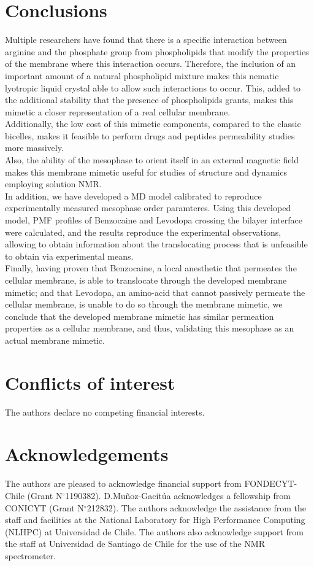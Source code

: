 \documentclass[3p,preprint,review]{elsarticle}
\begin{document}
	\section{Conclusions}
	Multiple researchers\cite{Aliaga2011,Hristova2011} have found
	that there is a specific interaction between arginine and the phosphate group
	from
	phospholipids
	that modify the properties of the membrane where this interaction occurs.
	Therefore, the inclusion of an important amount of a natural phospholipid
	mixture makes this nematic lyotropic liquid crystal able to allow such
	interactions to occur. This, added to the additional stability that the
  presence of phospholipids grants, makes this mimetic a closer representation of a real
	cellular membrane.\\
	Additionally, the low cost of this mimetic components, compared to the classic
	bicelles, makes it feasible to perform drugs and peptides permeability studies
	more massively.\\
	Also, the ability of the mesophase to orient itself in an external magnetic
	field
	makes this membrane mimetic useful for studies of structure and dynamics
	employing solution
	NMR.\\
	In addition, we have developed a MD model calibrated to reproduce
	experimentally measured mesophase order paramteres. Using this developed model,
	PMF profiles of Benzocaine and Levodopa crossing the bilayer interface were
	calculated, and the results reproduce the experimental observations, allowing to
	obtain information about the translocating process that is	unfeasible to obtain
	via experimental means.\\
	Finally, having proven that Benzocaine, a local anesthetic that permeates
	the cellular membrane, is able to translocate through the developed membrane
	mimetic; and that Levodopa, an amino-acid that cannot passively permeate the
	cellular membrane, is unable to do so through the membrane
	mimetic, we conclude that the developed membrane mimetic has
	similar permeation properties as a cellular membrane, and thus, validating this
	mesophase as an actual
	membrane mimetic.\\
	
	
	\section*{Conflicts of interest}
	The authors declare no competing financial interests.
	
	\section*{Acknowledgements}
	The authors are pleased to acknowledge financial support from FONDECYT-Chile
	(Grant N$^\circ$1190382). D.Muñoz-Gacitúa acknowledges a fellowship from
	CONICYT
	(Grant N$^\circ$212832). The authors acknowledge the assistance from the
	staff and facilities at the National Laboratory for High Performance Computing
	(NLHPC) at Universidad de Chile. The authors also acknowledge support from the
	staff at Universidad de Santiago de Chile for the use of the NMR spectrometer.
	
\end{document}
